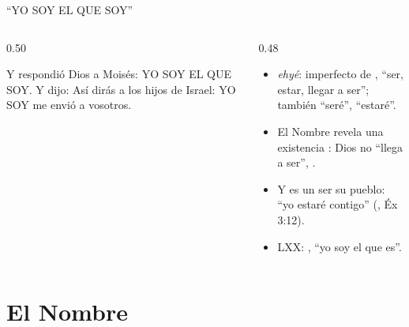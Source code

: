 \begin{frame}{``YO SOY EL QUE SOY''}
\begin{columns}[c,onlytextwidth]
\begin{column}{0.50\textwidth}
\begin{cita}Y respondió Dios a Moisés: YO SOY EL QUE SOY. Y dijo: Así dirás a los hijos de Israel: YO SOY me envió a vosotros.\end{cita}
\begin{center}\Large{}\end{center}
\end{column}
\begin{column}{0.48\textwidth}\small
\begin{itemize}
\item {} \emph{ehyé}: imperfecto de , ``ser, estar, llegar a ser''; también ``seré'', ``estaré''.
\item El Nombre revela una existencia : Dios no ``llega a ser'', .
\item Y es un ser  su pueblo: ``yo estaré contigo'' (, Éx 3:12).
\item LXX: , ``yo soy el que es''.
\end{itemize}
\end{column}
\end{columns}\par\smallskip
{}
\end{frame}

\section{El Nombre}

